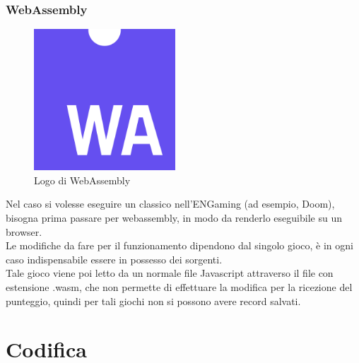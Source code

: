 \subsubsection{WebAssembly}
\begin{figure}[h]
    \centering
    \includegraphics[width=150pt]{images/technologies/webassembly.png}
    \caption{Logo di WebAssembly}
    \label{fig:webassembly}
\end{figure}
Nel caso si volesse eseguire un classico nell'ENGaming (ad esempio, Doom), bisogna prima passare per \gls{webassembly}, in modo da renderlo eseguibile su un browser.\\
Le modifiche da fare per il funzionamento dipendono dal singolo gioco, è in ogni caso indispensabile essere in possesso dei sorgenti.\\
Tale gioco viene poi letto da un normale file Javascript attraverso il file con estensione .wasm, che non permette di effettuare la modifica per la ricezione del punteggio, quindi per tali giochi non si possono avere record salvati.


\section{Codifica}
